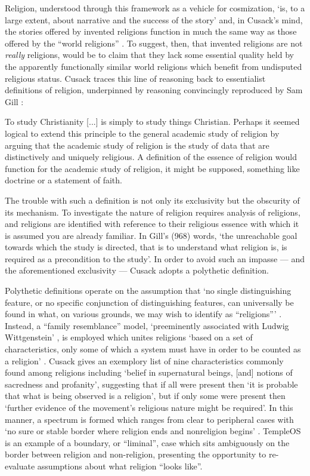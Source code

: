 Religion, understood through this framework as a vehicle for cosmization,
`is, to a large extent, about narrative and the success of the story'
and, in Cusack's mind,
the stories offered by invented religions function in much the same way
as those offered by the ``world religions'' \parencite[4]{Cusack10}.
To suggest, then, that invented religions are not \textit{really} religions,
would be to claim that they lack some essential quality held by
the apparently functionally similar world religions
which benefit from undisputed religious status.
Cusack traces this line of reasoning back to essentialist definitions
of religion, underpinned by reasoning convincingly
reproduced by Sam Gill \parencite*[968]{Gill94}:
\begin{displayquote}
  To study Christianity [...] is simply to study things Christian.
  Perhaps it seemed logical to extend this principle to the general
  academic study of religion by arguing that the academic study of religion
  is the study of data that are distinctively and uniquely religious.
  A definition of the essence of religion would function for the academic
  study of religion, it might be supposed, something like doctrine or a
  statement of faith.
\end{displayquote}
The trouble with such a definition is not only its exclusivity but the
obscurity of its mechanism.
To investigate the nature of religion requires analysis of religions,
and religions are identified with reference to their religious essence
with which it is assumed you are already familiar.
In Gill's (968) words, `the unreachable goal towards which the study
is directed, that is to understand what religion is,
is required as a precondition to the study'.
In order to avoid such an impasse --- and the aforementioned exclusivity ---
Cusack adopts a polythetic definition.

Polythetic definitions operate on the assumption that
`no single distinguishing feature, or no specific conjunction
of distinguishing features, can universally be found in what,
on various grounds, we may wish to identify as ``religions''\thinspace'
\parencite[158]{Saler93}.
Instead, a ``family resemblance'' model, `preeminently associated with
Ludwig Wittgenstein' \parencite[159]{Saler93}, is employed which unites
religions `based on a set of characteristics, only some of which a system
must have in order to be counted as a religion' \parencite[158]{Wilson98}.
Cusack \parencite*[20]{Cusack10} gives an exemplory list
of nine characteristics commonly found among religions including
`belief in supernatural beings, [and] notions of sacredness and profanity',
suggesting that if all were present then `it is probable that what is being
observed is a religion', but if only some were present then `further
evidence of the movement's religious nature might be required'.
In this manner, a spectrum is formed which ranges from clear to
peripheral cases with `no sure or stable border where religion ends and
nonreligion begins' \parencite[396]{Saler99}.
TempleOS is an example of a boundary, or ``liminal'', case which sits
ambiguously on the border between religion and non-religion, presenting
the opportunity to re-evaluate assumptions about what religion ``looks like''.

